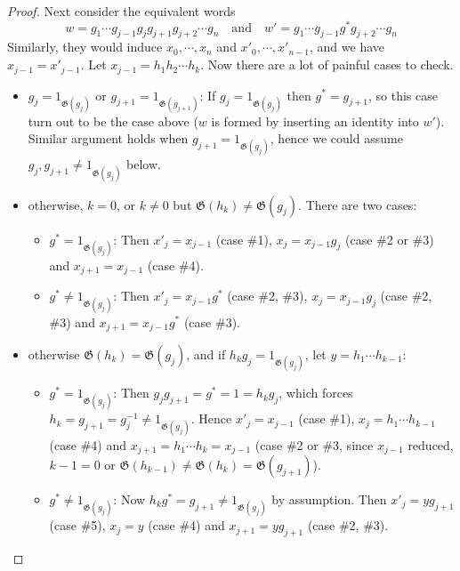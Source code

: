 \documentclass[a4paper,titlepage]{article}
\theoremstyle{remark}
\theoremstyle{definition}
\theoremstyle{definition}
\theoremstyle{plain}
\newcommand{\gid}{\mathfrak{G}}
\begin{document}
\begin{proof}
    Next consider the equivalent words
    \[ w = g_1 \cdots g_{j-1} g_j g_{j+1} g_{j+2} \cdots g_n 
      \quad\text{and}\quad w' = g_1 \cdots g_{j-1} g^* g_{j+2} \cdots g_n \]
    Similarly, they would induce $x_0, \cdots, x_n$ and $x'_0, \cdots, x'_{n-1}$, and
    we have $x_{j-1} = x'_{j-1}$. Let $x_{j-1} = h_1 h_2 \cdots h_k$. 
    Now there are a lot of painful cases to check.
    \begin{itemize}
      \item $g_j = 1_{\gid(g_j)} \text{ or } g_{j+1} = 1_{\gid(g_{j+1})}$: 
        If $g_j = 1_{\gid(g_j)}$ then $g^* = g_{j+1}$, so this case turn out to be the case above ($w$
        is formed by inserting an identity into $w'$). Similar argument holds when $g_{j+1} = 1_{\gid(g_j)}$,
        hence we could assume $g_j, g_{j+1} \neq 1_{\gid(g_j)}$ below.
      \item otherwise, $k = 0$, or $k \neq 0$ but $\gid(h_k) \neq \gid(g_j)$. There are two cases:
        \begin{itemize}
          \item $g^* = 1_{\gid(g_j)}$: Then $x'_j = x_{j-1}$ (case \#1), $x_j = x_{j-1} g_j$ (case \#2 
            or \#3) and $x_{j+1} = x_{j-1}$ (case \#4).
          \item $g^* \neq 1_{\gid(g_j)}$: Then $x'_j = x_{j-1} g^*$ (case \#2, \#3),
            $x_j = x_{j-1} g_j$ (case \#2, \#3) and $x_{j+1} = x_{j-1} g^*$ (case \#3).
        \end{itemize}
      \item otherwise $\gid(h_k) = \gid(g_j)$, and if $h_k g_j = 1_{\gid(g_j)}$,
        let $y = h_1 \cdots h_{k-1}$:
        \begin{itemize}
          \item $g^* = 1_{\gid(g_j)}$: Then $g_j g_{j+1} = g^* = 1 = h_k g_j$, which forces
            $h_k = g_{j+1} = g^{-1}_j \neq 1_{\gid(g_j)}$.  
            Hence $x'_j = x_{j-1}$ (case \#1), $x_j = h_1 \cdots h_{k-1}$
            (case \#4) and $x_{j+1} = h_1 \cdots h_k = x_{j-1}$ (case \#2 or \#3, since $x_{j-1}$ reduced, 
            $k-1 = 0$ or $\gid(h_{k-1}) \neq \gid(h_k) = \gid(g_{j+1})$).
          \item $g^* \neq 1_{\gid(g_j)}$: 
            Now $h_k g^* = g_{j+1} \neq 1_{\gid(g_j)}$ by assumption. Then
              $x'_j = y g_{j+1}$ (case \#5), $x_j = y$ (case \#4) and $x_{j+1} = y g_{j+1}$ 
                (case \#2, \#3).
        \end{itemize}


\end{itemize}
\end{proof}
\end{document}
